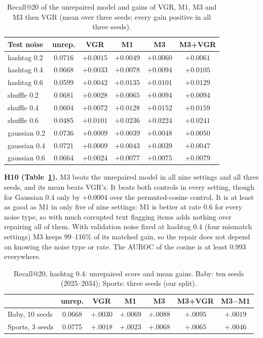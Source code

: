 \documentclass[conference]{IEEEtran}
\begin{document}
\begin{table}[t]
\centering\caption{Recall@20 of the unrepaired model and gains of VGR, M1, M3 and M3 then VGR (mean over three seeds; every gain positive in all three seeds).}
\label{tab:grid}
\footnotesize\setlength{\tabcolsep}{3pt}
\begin{tabular}{@{}lccccc@{}}
\hline
Test noise & unrep. & VGR & M1 & M3 & M3+VGR \\
\hline
hashtag 0.2 & 0.0716 & $+0.0015$ & $+0.0049$ & $+0.0060$ & $+0.0061$ \\
hashtag 0.4 & 0.0668 & $+0.0033$ & $+0.0078$ & $+0.0094$ & $+0.0105$ \\
hashtag 0.6 & 0.0599 & $+0.0042$ & $+0.0135$ & $+0.0101$ & $+0.0129$ \\
shuffle 0.2 & 0.0681 & $+0.0028$ & $+0.0065$ & $+0.0094$ & $+0.0094$ \\
shuffle 0.4 & 0.0604 & $+0.0072$ & $+0.0128$ & $+0.0152$ & $+0.0159$ \\
shuffle 0.6 & 0.0485 & $+0.0101$ & $+0.0236$ & $+0.0224$ & $+0.0241$ \\
gaussian 0.2 & 0.0736 & $+0.0009$ & $+0.0039$ & $+0.0048$ & $+0.0050$ \\
gaussian 0.4 & 0.0721 & $+0.0009$ & $+0.0043$ & $+0.0039$ & $+0.0047$ \\
gaussian 0.6 & 0.0664 & $+0.0024$ & $+0.0077$ & $+0.0075$ & $+0.0079$ \\
\hline
\end{tabular}
\end{table}

\textbf{H10 (Table~\ref{tab:grid}).} M3 beats the unrepaired model in all nine settings and all three seeds, and its mean beats VGR's. It beats both controls in every setting, though for Gaussian 0.4 only by $+0.0004$ over the permuted-cosine control. It is at least as good as M1 in only five of nine settings: M1 is better at rate 0.6 for every noise type, so with much corrupted text flagging items adds nothing over repairing all of them. With validation noise fixed at hashtag 0.4 (four mismatch settings) M3 keeps 99--116\% of its matched gain, so the repair does not depend on knowing the noise type or rate. The AUROC of the cosine is at least 0.993 everywhere.

\begin{table}[t]
\centering\caption{Recall@20, hashtag 0.4: unrepaired score and mean gains. Baby: ten seeds (2025--2034); Sports: three seeds (our split).}
\label{tab:seeds}
\scriptsize\setlength{\tabcolsep}{2pt}
\begin{tabular}{@{}lcccccc@{}}
\hline
 & unrep. & VGR & M1 & M3 & M3+VGR & M3$-$M1 \\
\hline
Baby, 10 seeds & 0.0668 & $+.0030$ & $+.0069$ & $+.0088$ & $+.0095$ & $+.0019$ \\
Sports, 3 seeds & 0.0775 & $+.0018$ & $+.0023$ & $+.0068$ & $+.0065$ & $+.0046$ \\
\hline
\end{tabular}
\end{table}
\end{document}
